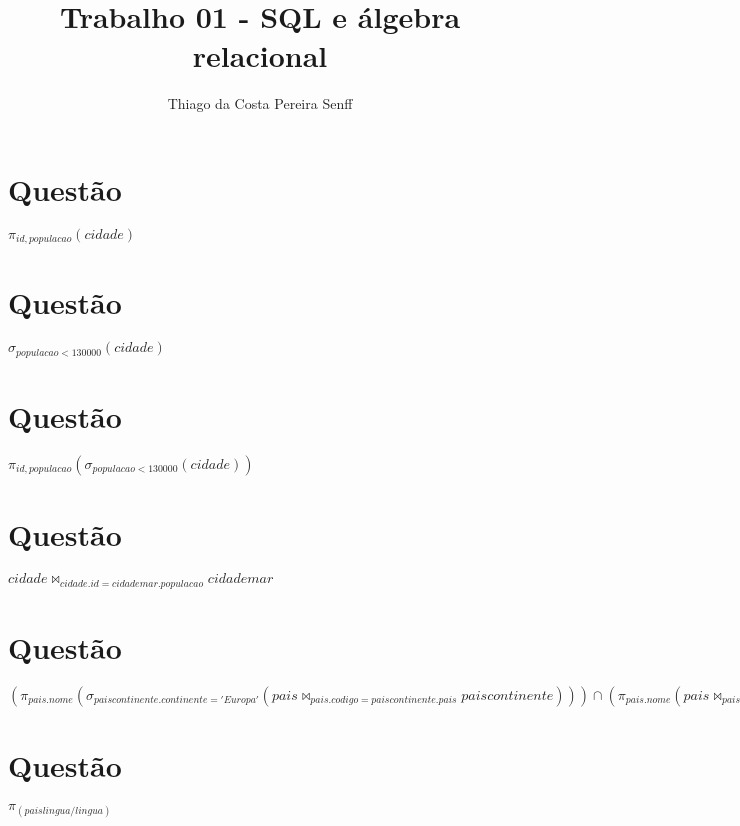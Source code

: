 \documentclass[a4paper, 11pt]{article}
\author{Thiago da Costa Pereira Senff}
\title{Trabalho 01 - SQL e álgebra relacional }
\begin{document}
    \maketitle
    \tableofcontents

    \section{Questão}
        $ \pi_{id, populacao}(cidade) $

    \section{Questão}
        $ \sigma_{populacao<130000}(cidade) $

        
    \section{Questão}
        $ \pi_{id, populacao}(\sigma_{populacao<130000}(cidade)) $

    \section{Questão}
        $ cidade \bowtie_{cidade.id = cidademar.populacao} cidademar $

    \section{Questão}
        $ 
            (\pi_{pais.nome}( \sigma_{paiscontinente.continente='Europa'}(pais\bowtie_{pais.codigo=paiscontinente.pais} paiscontinente) ) )
            \cap 
            (\pi_{pais.nome}(pais \bowtie_{pais.codigo=paisreligiao.pais} paisreligiao))  
        $
        
    \section{Questão}
        $
            \pi_(paislingua/lingua)  
        $
\end{document}
